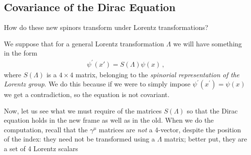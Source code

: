 \documentclass[main.tex]{subfiles}
\begin{document}
\subsection{Covariance of the Dirac Equation}


How do these new spinors transform under Lorentz transformations? 

We suppose that for a general Lorentz transformation \(\Lambda \) we will have something in the form 
%
\begin{align}
\psi^{\prime } (x') = S(\Lambda ) \psi (x)
\,,
\end{align}
%
where \(S(\Lambda )\) is a \(4 \times 4\) matrix, belonging to the \emph{spinorial representation of the Lorentz group}. 
We do this because if we were to simply impose \(\psi^{\prime }(x^{\prime }) = \psi (x)\) we get a contradiction, so the equation is not covariant. 

Now, let us see what we must require of the matrices \(S(\Lambda )\) so that the Dirac equation holds in the new frame as well as in the old. 
When we do the computation, recall that the \(\gamma^{\mu }\) matrices are \emph{not} a 4-vector, despite the position of the index: they need not be transformed using a \(\Lambda \) matrix; better put, they are a set of 4 Lorentz scalars
\end{document}
